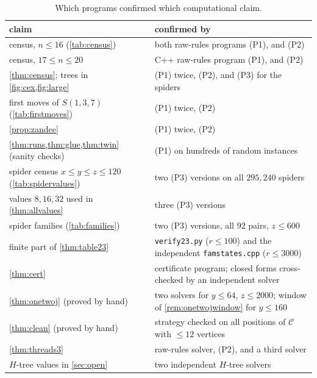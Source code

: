 \documentclass[11pt]{amsart}
\theoremstyle{definition}
\theoremstyle{remark}
\newcommand{\Sp}{S}
\begin{document}
\begin{table}[t]
\centering
\small
\begin{tabular}{p{6.4cm}p{6.6cm}}
\toprule
claim & confirmed by\\
\midrule
census, $n\le 16$ (\cref{tab:census}) & both raw-rules programs (P1), and (P2)\\
census, $17\le n\le 20$ & C++ raw-rules program (P1), and (P2)\\
\cref{thm:census}; trees in \cref{fig:cex,fig:large} & (P1) twice, (P2), and (P3) for the spiders\\
first moves of $\Sp(1,3,7)$ (\cref{tab:firstmoves}) & (P1) twice, (P2)\\
\cref{prop:zandee} & (P1) twice, (P2)\\
\cref{thm:runs,thm:glue,thm:twin} (sanity checks) & (P1) on hundreds of random instances\\
spider census $x\le y\le z\le 120$ (\cref{tab:spidervalues}) & two (P3) versions on all $295{,}240$ spiders\\
values $8,16,32$ used in \cref{thm:allvalues} & three (P3) versions\\
spider families (\cref{tab:families}) & two (P3) versions, all $92$ pairs, $z\le 600$\\
finite part of \cref{thm:table23} & \texttt{verify23.py} ($r\le 100$) and the independent \texttt{famstates.cpp} ($r\le 3000$)\\
\cref{thm:cert} & certificate program; closed forms cross-checked by an independent solver\\
\cref{thm:onetwoj} (proved by hand) & two solvers for $y\le 64$, $z\le 2000$; window of \cref{rem:onetwojwindow} for $y\le 160$\\
\cref{thm:clean} (proved by hand) & strategy checked on all positions of $\mathcal C$ with $\le 12$ vertices\\
\cref{thm:threads3} & raw-rules solver, (P2), and a third solver\\
$H$-tree values in \cref{sec:open} & two independent $H$-tree solvers\\
\bottomrule
\end{tabular}
\caption{Which programs confirmed which computational claim.}
\label{tab:verification}
\end{table}
\end{document}
